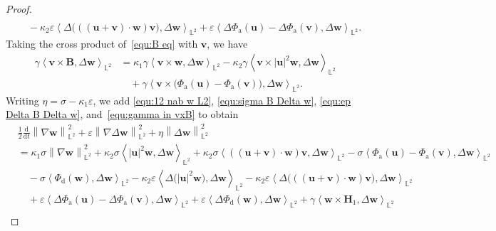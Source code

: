 \documentclass[11pt, reqno]{amsart}
\theoremstyle{definition}
\numberwithin{equation}{section}
\newcommand{\bff}{\boldsymbol}
\newcommand{\bb}{\mathbb}
\newcommand{\ddt}{\frac{\mathrm{d}}{\mathrm{d}t}}
\newcommand{\norm}[2]{\left\|{#1}\right\|_{#2}}
\newcommand{\inpro}[2]{\left\langle#1,#2\right\rangle}
\begin{document}
\begin{proof}
\begin{align}
    \nonumber \\
    &\quad
    -
    \kappa_2 \varepsilon \inpro{\Delta\big(((\bff{u}+\bff{v})\cdot \bff{w})\bff{v}\big)}{\Delta \bff{w}}_{\bb{L}^2}
    +
    \varepsilon \inpro{\Delta \Phi_{\mathrm{a}}(\bff{u})-\Delta \Phi_{\mathrm{a}}(\bff{v})}{\Delta \bff{w}}_{\bb{L}^2}.
\end{align}
Taking the cross product of~\eqref{equ:B eq} with $\bff{v}$, we have
\begin{align}\label{equ:gamma in vxB}
    \gamma \inpro{\bff{v}\times \bff{B}}{\Delta \bff{w}}_{\bb{L}^2}
    &=
    \kappa_1 \gamma \inpro{\bff{v}\times \bff{w}}{\Delta \bff{w}}_{\bb{L}^2}
    -
    \kappa_2 \gamma \inpro{\bff{v}\times |\bff{u}|^2 \bff{w}}{\Delta \bff{w}}_{\bb{L}^2}
    \nonumber \\
    &\quad
    +
    \gamma \inpro{\bff{v} \times \big(\Phi_{\mathrm{a}}(\bff{u})-\Phi_{\mathrm{a}}(\bff{v})\big)}{\Delta \bff{w}}_{\bb{L}^2}.
\end{align}
Writing $\eta=\sigma-\kappa_1\varepsilon$, we add \eqref{equ:12 nab w L2}, \eqref{equ:sigma B Delta w}, \eqref{equ:ep Delta B Delta w}, and~\eqref{equ:gamma in vxB} to obtain
\begin{align}\label{equ:I1 to I16}
    &\frac12 \ddt \norm{\nabla \bff{w}}{\bb{L}^2}^2
    +
    \varepsilon \norm{\nabla \Delta \bff{w}}{\bb{L}^2}^2
    +
    \eta \norm{\Delta \bff{w}}{\bb{L}^2}^2
    \nonumber \\
    &=
    \kappa_1 \sigma \norm{\nabla \bff{w}}{\bb{L}^2}^2
    +
    \kappa_2 \sigma \inpro{|\bff{u}|^2 \bff{w}}{\Delta \bff{w}}_{\bb{L}^2}
    +
    \kappa_2 \sigma \inpro{((\bff{u}+\bff{v})\cdot \bff{w})\bff{v}}{\Delta \bff{w}}_{\bb{L}^2}
    -
    \sigma \inpro{\Phi_{\mathrm{a}}(\bff{u})-\Phi_{\mathrm{a}}(\bff{v})}{\Delta \bff{w}}_{\bb{L}^2}
    \nonumber \\
    &\quad
    -
    \sigma \inpro{\Phi_{\mathrm{d}} (\bff{w})}{\Delta \bff{w}}_{\bb{L}^2}
    -
    \kappa_2 \varepsilon \inpro{\Delta \big(|\bff{u}|^2 \bff{w}\big)}{\Delta \bff{w}}_{\bb{L}^2}
    -
    \kappa_2 \varepsilon \inpro{\Delta\big(((\bff{u}+\bff{v})\cdot \bff{w})\bff{v}\big)}{\Delta \bff{w}}_{\bb{L}^2}
    \nonumber \\
    &\quad
    +
    \varepsilon \inpro{\Delta \Phi_{\mathrm{a}}(\bff{u})-\Delta \Phi_{\mathrm{a}}(\bff{v})}{\Delta \bff{w}}_{\bb{L}^2}
    +
    \varepsilon \inpro{\Delta \Phi_{\mathrm{d}}(\bff{w})}{\Delta \bff{w}}_{\bb{L}^2}
    +
    \gamma \inpro{\bff{w}\times \bff{H}_1}{\Delta \bff{w}}_{\bb{L}^2}
    \nonumber \\

\end{align}
\end{proof}
\end{document}
